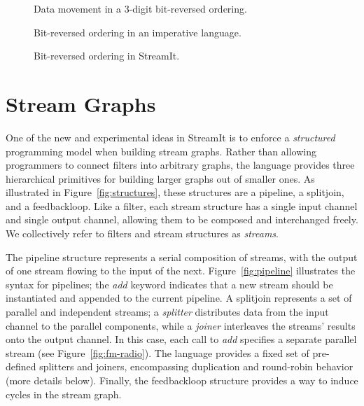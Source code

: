 \begin{figure}[t]
\centering
\begin{minipage}{2.5in}
\centering
{}
\end{minipage}
\hspace{0.5in}
\begin{minipage}{3in}
\centering
{}
\end{minipage}

\begin{minipage}{2.5in}
\caption{Data movement in a 3-digit bit-reversed ordering.\protect\label{fig:bitreverse-pattern}}
\end{minipage}
\hspace{0.5in}
\begin{minipage}{3in}
\centering
\caption{Bit-reversed ordering in an imperative language.\protect\label{fig:bitreverse-c}}
\end{minipage}

\end{figure}

\begin{figure}[t]
\centering
{}
\caption{Bit-reversed ordering in StreamIt.\protect\label{fig:bitreverse-streamit}}
\end{figure}

\section{Stream Graphs}

One of the new and experimental ideas in StreamIt is to enforce a {\it
  structured} programming model when building stream graphs.  Rather
than allowing programmers to connect filters into arbitrary graphs,
the language provides three hierarchical primitives for building
larger graphs out of smaller ones.  As illustrated in
Figure~\ref{fig:structures}, these structures are a pipeline, a
splitjoin, and a feedbackloop.  Like a filter, each stream structure
has a single input channel and single output channel, allowing them to
be composed and interchanged freely.  We collectively refer to filters
and stream structures as {\it streams}.

The pipeline structure represents a serial composition of streams,
with the output of one stream flowing to the input of the next.
Figure~\ref{fig:pipeline} illustrates the syntax for pipelines; the
{\it add} keyword indicates that a new stream should be instantiated
and appended to the current pipeline.  A splitjoin represents a set of
parallel and independent streams; a {\it splitter} distributes data
from the input channel to the parallel components, while a {\it
  joiner} interleaves the streams' results onto the output channel.
In this case, each call to {\it add} specifies a separate parallel
stream (see Figure~\ref{fig:fm-radio}).  The language provides a fixed
set of pre-defined splitters and joiners, encompassing duplication and
round-robin behavior (more details below).  Finally, the feedbackloop
structure provides a way to induce cycles in the stream graph.

